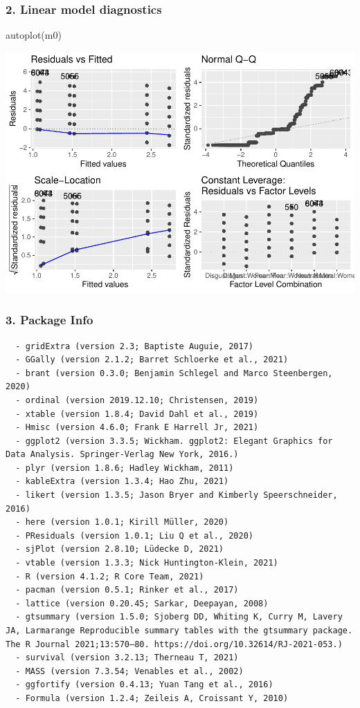 \documentclass[
]{article}
\newenvironment{Shaded}{\begin{snugshade}}{\end{snugshade}}
\newcommand{\FunctionTok}[1]{\textcolor[rgb]{0.00,0.00,0.00}{#1}}
\newcommand{\NormalTok}[1]{#1}
\begin{document}
\hypertarget{linear-model-diagnostics}{%
\subsubsection{2. Linear model
diagnostics}\label{linear-model-diagnostics}}

\begin{Shaded}
\begin{Highlighting}[]
\FunctionTok{autoplot}\NormalTok{(m0)}
\end{Highlighting}
\end{Shaded}

\includegraphics{DAP_v4-1-22_files/figure-latex/unnamed-chunk-12-1.pdf}

\hypertarget{package-info}{%
\subsubsection{3. Package Info}\label{package-info}}

\begin{verbatim}
  - gridExtra (version 2.3; Baptiste Auguie, 2017)
  - GGally (version 2.1.2; Barret Schloerke et al., 2021)
  - brant (version 0.3.0; Benjamin Schlegel and Marco Steenbergen, 2020)
  - ordinal (version 2019.12.10; Christensen, 2019)
  - xtable (version 1.8.4; David Dahl et al., 2019)
  - Hmisc (version 4.6.0; Frank E Harrell Jr, 2021)
  - ggplot2 (version 3.3.5; Wickham. ggplot2: Elegant Graphics for Data Analysis. Springer-Verlag New York, 2016.)
  - plyr (version 1.8.6; Hadley Wickham, 2011)
  - kableExtra (version 1.3.4; Hao Zhu, 2021)
  - likert (version 1.3.5; Jason Bryer and Kimberly Speerschneider, 2016)
  - here (version 1.0.1; Kirill Müller, 2020)
  - PResiduals (version 1.0.1; Liu Q et al., 2020)
  - sjPlot (version 2.8.10; Lüdecke D, 2021)
  - vtable (version 1.3.3; Nick Huntington-Klein, 2021)
  - R (version 4.1.2; R Core Team, 2021)
  - pacman (version 0.5.1; Rinker et al., 2017)
  - lattice (version 0.20.45; Sarkar, Deepayan, 2008)
  - gtsummary (version 1.5.0; Sjoberg DD, Whiting K, Curry M, Lavery JA, Larmarange Reproducible summary tables with the gtsummary package. The R Journal 2021;13:570–80. https://doi.org/10.32614/RJ-2021-053.)
  - survival (version 3.2.13; Therneau T, 2021)
  - MASS (version 7.3.54; Venables et al., 2002)
  - ggfortify (version 0.4.13; Yuan Tang et al., 2016)
  - Formula (version 1.2.4; Zeileis A, Croissant Y, 2010)
\end{verbatim}
\end{document}
